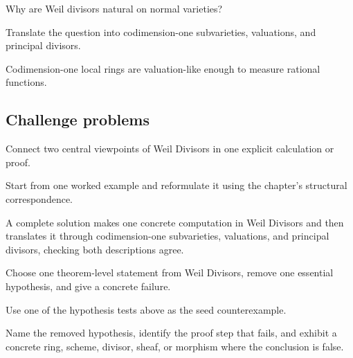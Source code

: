 \begin{exercise}\label{exr:vi39-expand-14}
Why are Weil divisors natural on normal varieties?
\end{exercise}
\begin{hint}
Translate the question into codimension-one subvarieties, valuations, and principal divisors.
\end{hint}
\begin{solution}
Codimension-one local rings are valuation-like enough to measure rational functions.
\end{solution}

\subsection*{Challenge problems}

\begin{exercise}\label{exr:vi39-expand-15}
Connect two central viewpoints of Weil Divisors in one explicit calculation or proof.
\end{exercise}
\begin{hint}
Start from one worked example and reformulate it using the chapter's structural correspondence.
\end{hint}
\begin{solution}
A complete solution makes one concrete computation in Weil Divisors and then translates it through codimension-one subvarieties, valuations, and principal divisors, checking both descriptions agree.
\end{solution}

\begin{exercise}\label{exr:vi39-expand-16}
Choose one theorem-level statement from Weil Divisors, remove one essential hypothesis, and give a concrete failure.
\end{exercise}
\begin{hint}
Use one of the hypothesis tests above as the seed counterexample.
\end{hint}
\begin{solution}
Name the removed hypothesis, identify the proof step that fails, and exhibit a concrete ring, scheme, divisor, sheaf, or morphism where the conclusion is false.
\end{solution}

